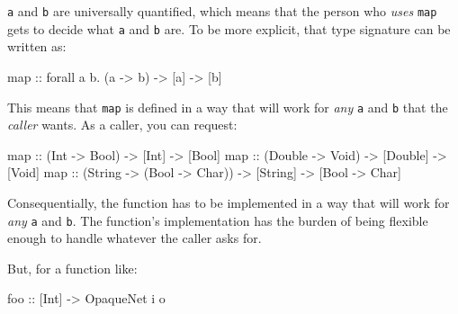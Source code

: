 \documentclass[]{article}
\newenvironment{Shaded}{}{}
\newcommand{\DataTypeTok}[1]{\textcolor[rgb]{0.56,0.13,0.00}{{#1}}}
\newcommand{\OtherTok}[1]{\textcolor[rgb]{0.00,0.44,0.13}{{#1}}}
\newcommand{\FunctionTok}[1]{\textcolor[rgb]{0.02,0.16,0.49}{{#1}}}
\newcommand{\NormalTok}[1]{{#1}}
\begin{document}
\texttt{a} and \texttt{b} are universally quantified, which means that the
person who \emph{uses} \texttt{map} gets to decide what \texttt{a} and
\texttt{b} are. To be more explicit, that type signature can be written as:

\begin{Shaded}
\begin{Highlighting}[]
\NormalTok{map}\OtherTok{ ::} \NormalTok{forall a b}\FunctionTok{.} \NormalTok{(a }\OtherTok{->} \NormalTok{b) }\OtherTok{->} \NormalTok{[a] }\OtherTok{->} \NormalTok{[b]}
\end{Highlighting}
\end{Shaded}

This means that \texttt{map} is defined in a way that will work for \emph{any}
\texttt{a} and \texttt{b} that the \emph{caller} wants. As a caller, you can
request:

\begin{Shaded}
\begin{Highlighting}[]
\NormalTok{map}\OtherTok{ ::} \NormalTok{(}\DataTypeTok{Int} \OtherTok{->} \DataTypeTok{Bool}\NormalTok{)    }\OtherTok{->} \NormalTok{[}\DataTypeTok{Int}\NormalTok{]    }\OtherTok{->} \NormalTok{[}\DataTypeTok{Bool}\NormalTok{]}
\NormalTok{map}\OtherTok{ ::} \NormalTok{(}\DataTypeTok{Double} \OtherTok{->} \DataTypeTok{Void}\NormalTok{) }\OtherTok{->} \NormalTok{[}\DataTypeTok{Double}\NormalTok{] }\OtherTok{->} \NormalTok{[}\DataTypeTok{Void}\NormalTok{]}
\NormalTok{map}\OtherTok{ ::} \NormalTok{(}\DataTypeTok{String} \OtherTok{->} \NormalTok{(}\DataTypeTok{Bool} \OtherTok{->} \DataTypeTok{Char}\NormalTok{)) }\OtherTok{->} \NormalTok{[}\DataTypeTok{String}\NormalTok{] }\OtherTok{->} \NormalTok{[}\DataTypeTok{Bool} \OtherTok{->} \DataTypeTok{Char}\NormalTok{]}
\end{Highlighting}
\end{Shaded}

Consequentially, the function has to be implemented in a way that will work for
\emph{any} \texttt{a} and \texttt{b}. The function's implementation has the
burden of being flexible enough to handle whatever the caller asks for.

But, for a function like:

\begin{Shaded}
\begin{Highlighting}[]
\OtherTok{foo ::} \NormalTok{[}\DataTypeTok{Int}\NormalTok{] }\OtherTok{->} \DataTypeTok{OpaqueNet} \NormalTok{i o}
\end{Highlighting}
\end{Shaded}
\end{document}
